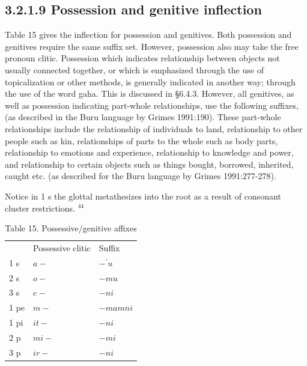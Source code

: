 \documentclass[10pt]{article}
\begin{document}
\subsection*{3.2.1.9 Possession and genitive inflection}
Table 15 gives the inflection for possession and genitives. Both possession and genitives require the same suffix set. However, possession also may take the free pronoun clitic. Possession which indicates relationship between objects not usually connected together, or which is emphasized through the use of topicalization or other methods, is generally indicated in another way; through the use of the word gaha. This is discussed in §6.4.3. However, all genitives, as well as possession indicating part-whole relationships, use the following suffixes, (as described in the Buru language by Grimes 1991:190). These part-whole relationships include the relationship of individuals to land, relationship to other people such as kin, relationships of parts to the whole such as body parts, relationship to emotions and experience, relationship to knowledge and power, and relationship to certain objects such as things bought, borrowed, inherited, caught etc. (as described for the Buru language by Grimes 1991:277-278).

Notice in 1 s the glottal metathesizes into the root as a result of consonant cluster restrictions. \({ }^{44}\)

\begin{table}[h]
\begin{center}
\captionsetup{labelformat=empty}
\caption{Table 15. Possessive/genitive affixes}
\begin{tabular}{lll}
 & Possessive clitic & Suffix \\
1 s & \(a-\) & \(-{ }^{\prime} u\) \\
2 s & \(o-\) & \(-m u\) \\
3 s & \(e-\) & \(-n i\) \\
1 pe & \(m-\) & \(-m a m n i\) \\
1 pi & \(i t-\) & \(-n i\) \\
2 p & \(m i-\) & \(-m i\) \\
3 p & \(i r-\) & \(-n i\) \\
\end{tabular}
\end{center}
\end{table}
\end{document}
